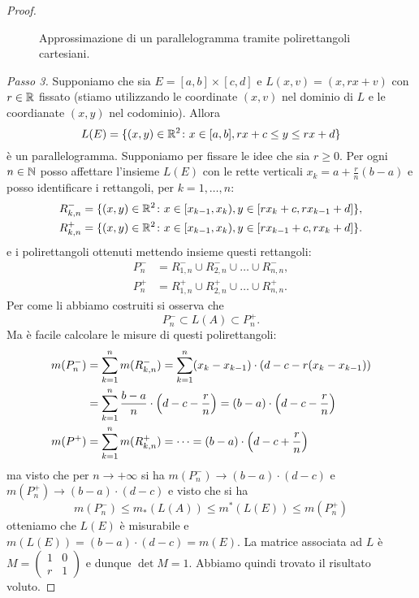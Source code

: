 \begin{proof}
\begin{figure}
  {}
  \caption{Approssimazione di un parallelogramma tramite polirettangoli cartesiani.}
\end{figure}

\emph{Passo 3.}
Supponiamo che sia $E=[a,b]\times[c,d]$ e $L(x,v)=(x,rx+v)$
con $r\in {\mathbb R}$ fissato
(stiamo utilizzando le coordinate $(x,v)$ nel dominio di $L$
e le coordianate $(x,y)$ nel codominio).
Allora
\[
  L(E) = \{(x,y)\in {\mathbb R}^2\colon x\in[a,b], rx+c \le y \le rx+d\}
\]
è un parallelogramma. 
Supponiamo per fissare le idee che sia $r\ge 0$.
Per ogni $n\in {\mathbb N}$ posso affettare l'insieme
$L(E)$ con le rette verticali $x_k = a+\frac{r}{n}(b-a)$ e posso
identificare i rettangoli, per $k=1,\dots, n$:
\begin{align*}
   R_{k,n}^-
   &= \{(x,y)\in {\mathbb R}^2 \colon x\in [x_{k-1},x_k), y\in[r x_k+c,r x_{k-1}+d]\},
   \\
   R_{k,n}^+
   &= \{(x,y)\in {\mathbb R}^2 \colon x\in [x_{k-1},x_k), y\in[r x_{k-1}+c,r x_k+d]\}.
\end{align*}
e i polirettangoli ottenuti mettendo insieme questi rettangoli:
\begin{align*}
  P^-_n &= R_{1,n}^- \cup R_{2,n}^- \cup \dots \cup R_{n,n}^-, \\
  P^+_n & = R_{1,n}^+ \cup R_{2,n}^+ \cup \dots \cup R_{n,n}^+.
\end{align*}
Per come li abbiamo costruiti si osserva che
\[
  P^-_n \subset L(A) \subset P^+_n.
\]
Ma è facile calcolare le misure di questi polirettangoli:
\begin{align*}
  m(P^-_n) &= \sum_{k=1}^n m(R_{k,n}^-)
          = \sum_{k=1}^n(x_k-x_{k-1})\cdot (d-c-r(x_k-x_{k-1}))\\
         &= \sum_{k=1}^n \frac {b-a} n \cdot {\left( d-c-\frac{r}{n} \right)}
          = (b-a)\cdot {\left( d-c-\frac{r}{n} \right)} \\
  m(P^+) &= \sum_{k=1}^n m(R_{k,n}^+) = \dots = (b-a)\cdot {\left( d-c+\frac{r}{n} \right)}
\end{align*}
ma visto che per $n\to +\infty$ si ha $m(P^-_n)\to (b-a)\cdot(d-c)$
e $m(P^+_n) \to (b-a)\cdot(d-c)$ e visto che si ha
\[
  m(P^-_n)\le m_*(L(A))\le m^*(L(E)) \le m(P^+_n)
\]
otteniamo che $L(E)$ è misurabile e $m(L(E)) = (b-a)\cdot(d-c) = m(E)$.
La matrice associata ad $L$ è $M=\begin{pmatrix}1 & 0 \\ r & 1 \end{pmatrix}$
e dunque $\det M = 1$. Abbiamo quindi trovato il risultato voluto.


\end{proof}
